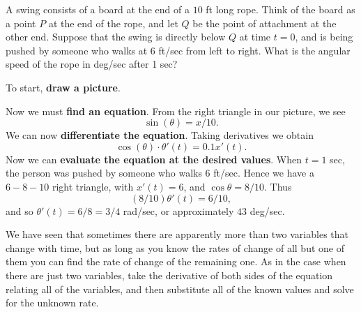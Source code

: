 \begin{example}
A swing consists of a board at the end of a $10$ ft long rope.  Think
of the board as a point $P$ at the end of the rope, and let $Q$ be the
point of attachment at the other end.  Suppose that the swing is
directly below $Q$ at time $t=0$, and is being pushed by someone who
walks at 6 ft/sec from left to right.  What is the angular speed of
the rope in deg/sec after 1 sec?
\end{example}

\begin{solution}
To start, \textbf{draw a picture}.


Now we must \textbf{find an equation}. From the right triangle in our
picture, we see
\[
\sin(\theta)=x/10.
\]
We can now \textbf{differentiate the equation}. Taking derivatives we obtain 
\[
\cos(\theta)\cdot \theta'(t)=0.1 x'(t).
\]
Now we can \textbf{evaluate the equation at the desired values}.  When
$t=1$ sec, the person was pushed by someone who walks $6$
ft/sec. Hence we have a $6-8-10$ right triangle, with $x'(t) = 6$, and
$\cos\theta=8/10$. Thus
\[
(8/10) \theta'(t) =6/10,
\]
and so  $\theta'(t)=6/8=3/4$ rad/sec, or approximately $43$ deg/sec.
\end{solution} 



We have seen that sometimes there are apparently more than two
variables that change with time, but as long as you know the rates of
change of all but one of them you can find the rate of change of the
remaining one.  As in the case when there are just two variables, take
the derivative of both sides of the equation relating all of the
variables, and then substitute all of the known values and solve for
the unknown rate.



